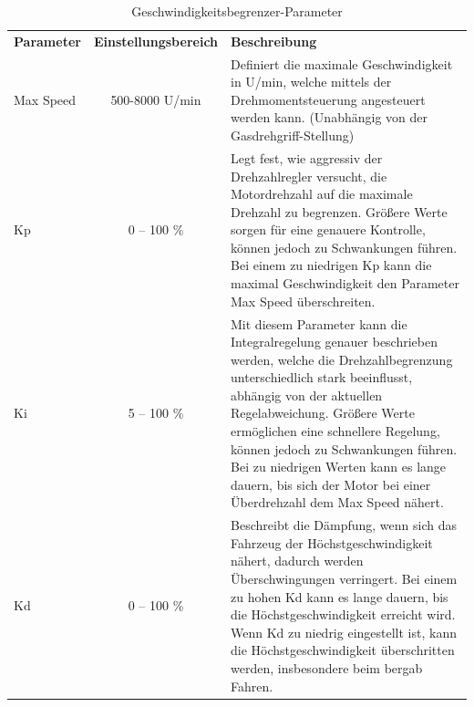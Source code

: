 \setlength{\tabcolsep}{9pt}
\begin{table}[H]
	\begin{tabular}{|lcp{8cm}|}\hline
	\rowcolor[gray]{0.8}\textbf{Parameter} & \textbf{Einstellungsbereich} &\textbf{Beschreibung}\\[2pt]
		Max Speed 	& 500-8000 U/min 	& Definiert die maximale Geschwindigkeit in U/min, welche mittels der Drehmomentsteuerung angesteuert werden kann. (Unabhängig von der Gasdrehgriff-Stellung)\\\hline
		Kp 			& 0 – 100 \% 		& Legt fest, wie aggressiv der Drehzahlregler versucht, die Motordrehzahl auf die maximale Drehzahl zu begrenzen. Größere Werte sorgen für eine genauere Kontrolle, können jedoch zu Schwankungen führen. Bei einem zu niedrigen Kp kann die maximal Geschwindigkeit den Parameter Max Speed überschreiten.\\\hline
		Ki 			& 5 – 100 \% 		& Mit diesem Parameter kann die Integralregelung genauer beschrieben werden, welche die Drehzahlbegrenzung unterschiedlich stark beeinflusst, abhängig von der aktuellen Regelabweichung. Größere Werte ermöglichen eine schnellere Regelung, können jedoch zu Schwankungen führen. Bei zu niedrigen Werten kann es lange dauern, bis sich der Motor bei einer Überdrehzahl dem Max Speed nähert. \\\hline
		Kd    		& 0 – 100 \% 		& Beschreibt die Dämpfung, wenn sich das Fahrzeug der Höchstgeschwindigkeit nähert, dadurch werden Überschwingungen verringert. Bei einem zu hohen Kd kann es lange dauern, bis die Höchstgeschwindigkeit erreicht wird. Wenn Kd zu niedrig eingestellt ist, kann die Höchstgeschwindigkeit überschritten werden, insbesondere beim bergab Fahren. \\\hline		
	\end{tabular}	
	\caption{Geschwindigkeitsbegrenzer-Parameter}
	\label{tab:Geschwindigkeitsbegrenzer-Parameter}
\end{table}

\newpage

